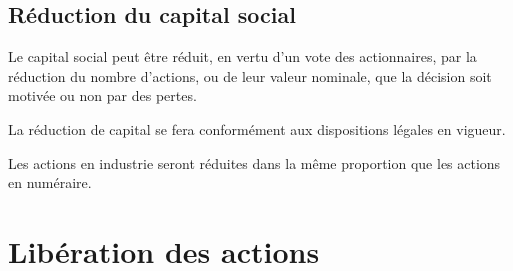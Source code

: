 \documentclass[a4paper,12pt]{report}
\begin{document}
%
%
%
%
%

\subsection{Réduction du capital social}

Le capital social peut être réduit, en vertu d'un vote des actionnaires, par la réduction du nombre d'actions, 
ou de leur valeur nominale, que la décision soit motivée ou non par des pertes.

La réduction de capital se fera conformément aux dispositions légales en vigueur.

Les actions en industrie seront réduites dans la même proportion que les actions en numéraire.

\section{Libération des actions}
%
\end{document}
